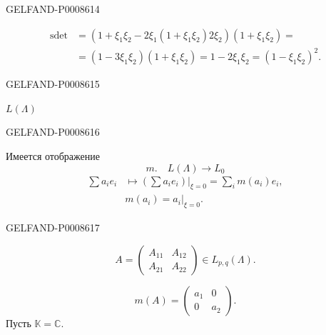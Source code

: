 \begin{GelfandAdjacentEvidence}{GELFAND-P000861}{4}

\[
\begin{aligned}
\operatorname{sdet}
 &=(1+\xi_1\xi_2-2\xi_1(1+\xi_1\xi_2)2\xi_2)(1+\xi_1\xi_2)=\\
 &=(1-3\xi_1\xi_2)(1+\xi_1\xi_2)=1-2\xi_1\xi_2=(1-\xi_1\xi_2)^2.
\end{aligned}
\]
\end{GelfandAdjacentEvidence}
\begin{GelfandAdjacentEvidence}{GELFAND-P000861}{5}



\(L(\Lambda)\)
\end{GelfandAdjacentEvidence}
\begin{GelfandAdjacentEvidence}{GELFAND-P000861}{6}


Имеется отображение
\[
m.\quad L(\Lambda)\longrightarrow L_0
\]
\[
\begin{aligned}
\sum a_i e_i
&\longmapsto\left.\left(\sum a_i e_i\right)\right|_{\xi=0}
=\sum_i m(a_i)e_i,\\
&m(a_i)=\left.a_i\right|_{\xi=0}.
\end{aligned}
\]
\end{GelfandAdjacentEvidence}
\begin{GelfandAdjacentEvidence}{GELFAND-P000861}{7}

\[
A=\begin{pmatrix}A_{11}&A_{12}\\A_{21}&A_{22}\end{pmatrix}\in L_{p,q}(\Lambda).
\]
\end{GelfandAdjacentEvidence}

\[
m(A)=\begin{pmatrix}a_1&0\\0&a_2\end{pmatrix}.\tag{9}
\]
Пусть \(\mathbb K=\mathbb C\).

